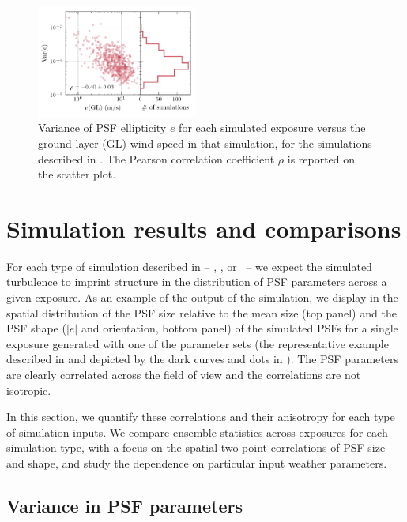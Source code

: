 \documentclass[twocolumn,twocolappendix]{openjournal}
\begin{document}
\begin{figure}
\includegraphics[width=0.47\textwidth]{f4_evar_speed.png}
    \caption{Variance of PSF ellipticity $e$ for each simulated exposure versus the ground layer (GL) wind speed in that simulation, for the \psfwssims simulations described in . 
    The Pearson correlation coefficient $\rho$ is reported on the scatter plot.
    \label{fig:paramvar}
    }
\end{figure}

\section{Simulation results and comparisons} \label{sec:imsimresults}

For each type of simulation described in  -- \psfwssims, \match, or \bench\ -- we expect the simulated turbulence to imprint structure in the distribution of PSF parameters across a given exposure. 
As an example of the output of the \psfwssims simulation, we display in  the spatial distribution of the PSF size relative to the mean size (top panel) and the PSF shape ($|e|$ and orientation, bottom panel) of the simulated PSFs for a single exposure generated with one of the \psfwssims parameter sets (the representative example described in  and depicted by the dark curves and dots in ). 
The PSF parameters are clearly correlated across the field of view and the correlations are not isotropic. 


In this section, we quantify these correlations and their anisotropy for each type of simulation inputs. 
We compare ensemble statistics across exposures for each simulation type, with a focus on the spatial two-point correlations of PSF size and shape, and study the dependence on particular input weather parameters.


\subsection{Variance in PSF parameters}
\label{sec:variances}
\end{document}
